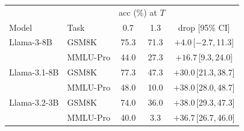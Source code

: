 \begin{tabular}{llccc}
\toprule
 & & \multicolumn{2}{c}{acc (\%) at $T$} & \\
Model & Task & 0.7 & 1.3 & drop [95\% CI] \\
\midrule
Llama-3-8B & GSM8K & 75.3 & 71.3 & $+4.0$\,[$-2.7$,\,11.3] \\
 & MMLU-Pro & 44.0 & 27.3 & $+16.7$\,[9.3,\,24.0] \\
\midrule
Llama-3.1-8B & GSM8K & 77.3 & 47.3 & $+30.0$\,[21.3,\,38.7] \\
 & MMLU-Pro & 48.0 & 10.0 & $+38.0$\,[28.0,\,48.7] \\
\midrule
Llama-3.2-3B & GSM8K & 74.0 & 36.0 & $+38.0$\,[29.3,\,47.3] \\
 & MMLU-Pro & 40.0 & 3.3 & $+36.7$\,[26.7,\,46.0] \\
\bottomrule
\end{tabular}
